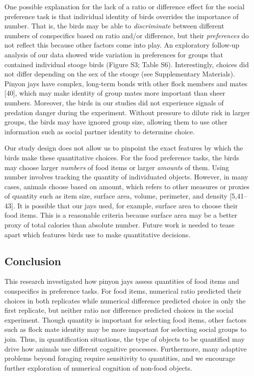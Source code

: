 \documentclass[
  ,doc,floatsintext]{apa6}
\begin{document}
One possible explanation for the lack of a ratio or difference effect for the social preference task is that individual identity of birds overrides the importance of number. That is, the birds may be able to \emph{discriminate} between different numbers of conspecifics based on ratio and/or difference, but their \emph{preferences} do not reflect this because other factors come into play. An exploratory follow-up analysis of our data showed wide variation in preferences for groups that contained individual stooge birds (Figure S3; Table S6). Interestingly, choices did not differ depending on the sex of the stooge (see Supplementary Materials). Pinyon jays have complex, long-term bonds with other flock members and mates {[}40{]}, which may make identity of group mates more important than sheer numbers. Moreover, the birds in our studies did not experience signals of predation danger during the experiment. Without pressure to dilute risk in larger groups, the birds may have ignored group size, allowing them to use other information such as social partner identity to determine choice.

Our study design does not allow us to pinpoint the exact features by which the birds make these quantitative choices. For the food preference tasks, the birds may choose larger \emph{numbers} of food items or larger \emph{amounts} of them. Using number involves tracking the quantity of individuated objects. However, in many cases, animals choose based on amount, which refers to other measures or proxies of quantity such as item size, surface area, volume, perimeter, and density {[}5,41--43{]}. It is possible that our jays used, for example, surface area to choose their food items. This is a reasonable criteria because surface area may be a better proxy of total calories than absolute number. Future work is needed to tease apart which features birds use to make quantitative decisions.

\hypertarget{conclusion}{%
\subsection{Conclusion}\label{conclusion}}

This research investigated how pinyon jays assess quantities of food items and conspecifics in preference tasks. For food items, numerical ratio predicted their choices in both replicates while numerical difference predicted choice in only the first replicate, but neither ratio nor difference predicted choices in the social experiment. Though quantity is important for selecting food items, other factors such as flock mate identity may be more important for selecting social groups to join. Thus, in quantification situations, the type of objects to be quantified may drive how animals use different cognitive processes. Furthermore, many adaptive problems beyond foraging require sensitivity to quantities, and we encourage further exploration of numerical cognition of non-food objects.
\end{document}
